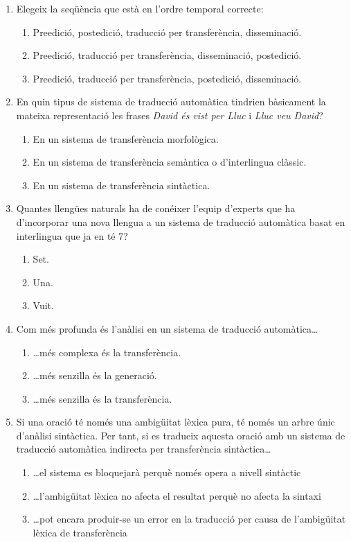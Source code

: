 \begin{enumerate}
\item Elegeix la seqüència que està en l'ordre temporal correcte:
  \begin{enumerate}
  \item Preedició, postedició, traducció per transferència,
    disseminació.
  \item Preedició, traducció per transferència, disseminació,
    postedició.
  \item Preedició, traducció per transferència, postedició,
    disseminació.
\end{enumerate}

\item En quin tipus de sistema de traducció automàtica tindrien
  bàsicament la mateixa representació les frases \emph{David és vist per
  Lluc} i \emph{Lluc veu David}?  
  \begin{enumerate}
  \item En un sistema de transferència morfològica.
  \item En un sistema de transferència semàntica o d'interlingua
    clàssic.
  \item En un sistema de transferència sintàctica.
  \end{enumerate}

\item Quantes llengües naturals ha de conéixer l'equip d'experts que
  ha d'incorporar una nova llengua a un sistema de traducció
  automàtica basat en interlingua que ja en té 7?   
  \begin{enumerate}
  \item Set.
  \item Una.
  \item Vuit.
  \end{enumerate}

\item Com més profunda és l'anàlisi en un sistema de traducció
  automàtica{\ldots}   
  \begin{enumerate}
  \item {\ldots}més complexa és la transferència.
  \item {\ldots}més senzilla és la generació.
  \item {\ldots}més senzilla és la transferència.
  \end{enumerate}

\item Si una oració té només una ambigüitat lèxica pura, té només un
  arbre únic d'anàlisi sintàctica. Per tant, si es tradueix aquesta
  oració amb un sistema de traducció automàtica indirecta per
  transferència sintàctica{\ldots}
  \begin{enumerate}
  \item {\ldots}el sistema es bloquejarà perquè només opera a nivell
    sintàctic
  \item {\ldots}l'ambigüitat lèxica no afecta el resultat perquè no
    afecta la sintaxi
  \item {\ldots}pot encara produir-se un error en la traducció per
    causa de l'ambigüitat lèxica de transferència
  \end{enumerate}


\end{enumerate}
